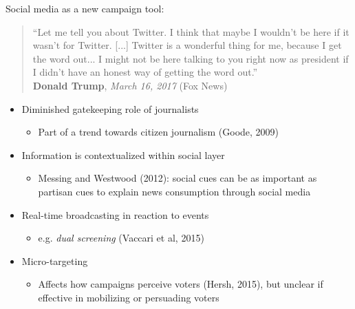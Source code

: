 \documentclass{beamer}
\begin{document}
\begin{frame}
	
	Social media as a new campaign tool:\\
	\vspace{.05cm} \begin{footnotesize}
		\begin{quote}\indent ``Let me tell you about Twitter. I think that maybe I wouldn't be here if it wasn't for Twitter. [...] Twitter is a wonderful thing for me, because I get the word out... I might not be here talking to you right now as president if I didn't have an honest way of getting the word out.'' \\
			\vspace{.1cm}
			\hfill \textbf{Donald Trump}, \textit{March 16, 2017} (Fox News) \end{quote}\end{footnotesize}
	\pause
	\begin{itemize}[<+->]
		\item Diminished \alert{gatekeeping} role of journalists
		\begin{itemize}
			\item \scriptsize{Part of a trend towards citizen journalism (Goode, 2009)}
		\end{itemize}
		\item Information is contextualized within \alert{social layer}
		\begin{itemize}
			\item  \scriptsize{Messing and Westwood (2012): social cues can be as important as partisan cues to explain news consumption through social media}
		\end{itemize}
		\item \alert{Real-time broadcasting} in reaction to events
		\begin{itemize}
			\item  \scriptsize{e.g. \textit{dual screening} (Vaccari et al, 2015)}
		\end{itemize}
		\item \alert{Micro-targeting}
		\begin{itemize}
			\item  \scriptsize{Affects how campaigns perceive voters (Hersh, 2015), but unclear if effective in mobilizing or persuading voters}
		\end{itemize}
	\end{itemize}
	
\end{frame}
\end{document}
